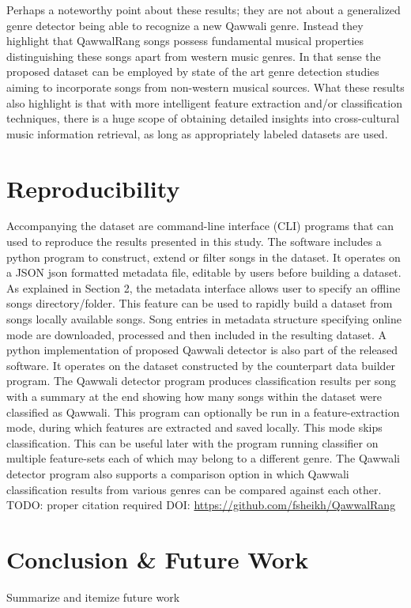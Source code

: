 \documentclass{article}
\begin{document}
Perhaps a noteworthy point about these results; they are not about a generalized genre detector being able to recognize a new Qawwali genre. Instead they highlight that QawwalRang songs possess fundamental musical properties distinguishing these songs apart from western music genres. In that sense the proposed dataset can be employed by state of the art genre detection studies aiming to incorporate songs from non-western musical sources. What these results also highlight is that with more intelligent feature extraction and/or classification techniques, there is a huge scope of obtaining detailed insights into cross-cultural music information retrieval, as long as appropriately labeled datasets are used. 

\section{Reproducibility}
Accompanying the dataset are command-line interface (CLI) programs that can used to reproduce the results presented in this study. The software includes a python program to construct, extend or filter songs in the dataset. It operates on a JSON \citep{JayashreeBhat}{json} formatted metadata file, editable by users before building a dataset. As explained in Section 2, the metadata interface allows user to specify an offline songs directory/folder. This feature can be used to rapidly build a dataset from songs locally available songs. Song entries in metadata structure specifying online mode are downloaded, processed and then included in the resulting dataset. A python implementation of proposed Qawwali detector is also part of the released software. It operates on the dataset constructed by the counterpart data builder program. The Qawwali detector program produces classification results per song with a summary at the end showing how many songs within the dataset were classified as Qawwali. This program can optionally be run in a feature-extraction mode, during which features are extracted and saved locally. This mode skips classification. This can be useful later with the program running classifier on multiple feature-sets each of which may belong to a different genre. The Qawwali detector program also supports a comparison option in which Qawwali classification results from various genres can be compared against each other. TODO: proper citation required DOI: \url{https://github.com/fsheikh/QawwalRang} 
\section{Conclusion \& Future Work}
Summarize and itemize future work 
\end{document}
